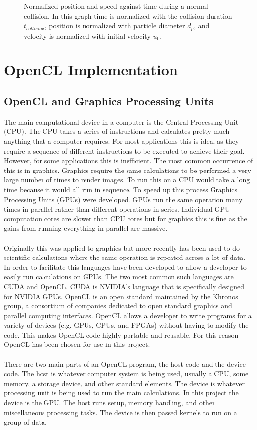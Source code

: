 \documentclass[a4paper,11pt,titlepage]{report}
\begin{document}
\begin{figure}[!htb]
\caption{Normalized position and speed against time during a normal collision. In this graph time is normalized with the collision duration $t_{collision}$, position is normalized with particle diameter $d_p$, and velocity is normalized with initial velocity $u_0$.}
\label{fig:python_friction_verification}
\end{figure}
\chapter{OpenCL Implementation}
\label{ch:OpenCL Implementation}
\section{OpenCL and Graphics Processing Units}
The main computational device in a computer is the Central Processing Unit (CPU). The CPU takes a series of instructions and calculates pretty much anything that a computer requires. For most applications this is ideal as they require a sequence of different instructions to be executed to achieve their goal. However, for some applications this is inefficient. The most common occurrence of this is in graphics. Graphics require the same calculations to be performed a very large number of times to render images. To run this on a CPU would take a long time because it would all run in sequence. To speed up this process Graphics Processing Units (GPUs) were developed. GPUs run the same operation many times in parallel rather than different operations in series. Individual GPU computation cores are slower than CPU cores but for graphics this is fine as the gains from running everything in parallel are massive.
\\\\Originally this was applied to graphics but more recently has been used to do scientific calculations where the same operation is repeated across a lot of data. In order to facilitate this languages have been developed to allow a developer to easily run calculations on GPUs. The two most common such languages are CUDA and OpenCL. CUDA is NVIDIA's language that is specifically designed for NVIDIA GPUs. OpenCL is an open standard maintained by the Khronos group, a consortium of companies dedicated to open standard graphics and parallel computing interfaces. OpenCL allows a developer to write programs for a variety of devices (e.g. GPUs, CPUs, and FPGAs) without having to modify the code. This makes OpenCL code highly portable and reusable. For this reason OpenCL has been chosen for use in this project.
\\\\There are two main parts of an OpenCL program, the host code and the device code. The host is whatever computer system is being used, usually a CPU, some memory, a storage device, and other standard elements. The device is whatever processing unit is being used to run the main calculations. In this project the device is the GPU. The host runs setup, memory handling, and other miscellaneous processing tasks. The device is then passed kernels to run on a group of data.
\end{document}
